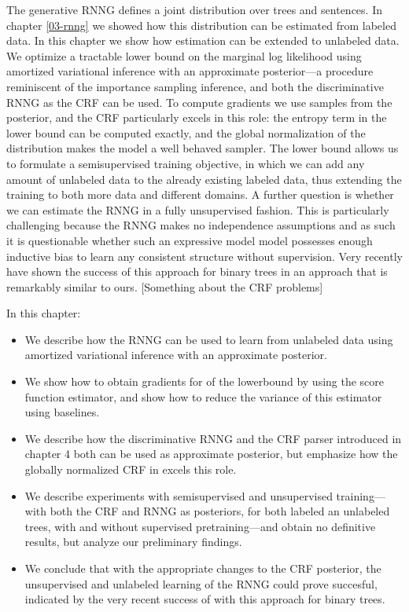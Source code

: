 The generative RNNG defines a joint distribution over trees and sentences. In chapter \ref{03-rnng} we showed how this distribution can be estimated from labeled data. In this chapter we show how estimation can be extended to unlabeled data. We optimize a tractable lower bound on the marginal log likelihood using amortized variational inference with an approximate posterior---a procedure reminiscent of the importance sampling inference, and both the discriminative RNNG as the CRF can be used. To compute gradients we use samples from the posterior, and the CRF particularly excels in this role: the entropy term in the lower bound can be computed exactly, and the global normalization of the distribution makes the model a well behaved sampler. The lower bound allows us to formulate a semisupervised training objective, in which we can add any amount of unlabeled data to the already existing labeled data, thus extending the training to both more data and different domains. A further question is whether we can estimate the RNNG in a fully unsupervised fashion. This is particularly challenging because the RNNG makes no independence assumptions and as such it is questionable whether such an expressive model model possesses enough inductive bias to learn any consistent structure without supervision. Very recently \citet{kim2019unsupervised} have shown the success of this approach for binary trees in an approach that is remarkably similar to ours. [Something about the CRF problems]

In this chapter:
\begin{itemize}
  \item We describe how the RNNG can be used to learn from unlabeled data using amortized variational inference with an approximate posterior.
  \item We show how to obtain gradients for of the lowerbound by using the score function estimator, and show how to reduce the variance of this estimator using baselines.
  \item We describe how the discriminative RNNG and the CRF parser introduced in chapter 4 both can be used as approximate posterior, but emphasize how the globally normalized CRF in excels this role.
  \item We describe experiments with semisupervised and unsupervised training---with both the CRF and RNNG as posteriors, for both labeled an unlabeled trees, with and without supervised pretraining---and obtain no definitive results, but analyze our preliminary findings.
  \item We conclude that with the appropriate changes to the CRF posterior, the unsupervised and unlabeled learning of the RNNG could prove succesful, indicated by the very recent success of \citet{kim2019unsupervised} with this approach for binary trees.
\end{itemize}


